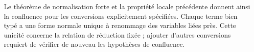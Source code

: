 \documentclass[../../../include/open-logic-section]{subfiles}
\begin{document}
Le théorème de normalisation forte et la propriété locale
précédente donnent ainsi la confluence pour les conversions
explicitement spécifiées. Chaque terme bien typé a une
forme normale unique à renommage des variables liées près.
Cette unicité concerne la relation de réduction fixée ;
ajouter d'autres conversions requiert de vérifier de
nouveau les hypothèses de confluence.
\end{document}
